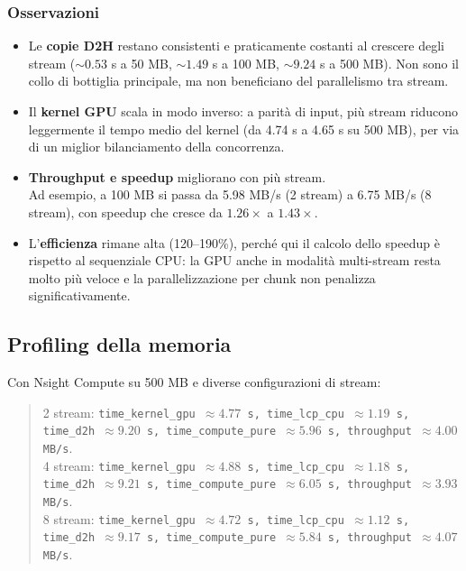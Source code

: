 			\subsubsection*{Osservazioni}
				\begin{itemize}
						\item Le \textbf{copie D2H} restano consistenti e praticamente costanti al crescere degli stream (\(\sim 0.53\) s a 50 MB, \(\sim 1.49\) s a 100 MB, \(\sim 9.24\) s a 500 MB). Non sono il collo di bottiglia principale, ma non beneficiano del parallelismo tra stream.
						\item Il \textbf{kernel GPU} scala in modo inverso: a parità di input, più stream riducono leggermente il tempo medio del kernel (da 4.74 s a 4.65 s su 500 MB), per via di un miglior bilanciamento della concorrenza.
						\item \textbf{Throughput e speedup} migliorano con più stream. \\
						Ad esempio, a 100 MB si passa da 5.98 MB/s (2 stream) a 6.75 MB/s (8 stream), con speedup che cresce da \(1.26\times\) a \(1.43\times\).
						\item L’\textbf{efficienza} rimane alta (120–190\%), perché qui il calcolo dello speedup è rispetto al sequenziale CPU: la GPU anche in modalità multi-stream resta molto più veloce e la parallelizzazione per chunk non penalizza significativamente.
				\end{itemize}
		
		\subsection{Profiling della memoria}
			Con Nsight Compute su 500 MB e diverse configurazioni di stream:
			\begin{quote}
				\small
				2 stream: \texttt{time\_kernel\_gpu \(\approx 4.77\) s, time\_lcp\_cpu \(\approx 1.19\) s, time\_d2h \(\approx 9.20\) s, time\_compute\_pure \(\approx 5.96\) s, throughput \(\approx 4.00\) MB/s}.\\
				4 stream: \texttt{time\_kernel\_gpu \(\approx 4.88\) s, time\_lcp\_cpu \(\approx 1.18\) s, time\_d2h \(\approx 9.21\) s, time\_compute\_pure \(\approx 6.05\) s, throughput \(\approx 3.93\) MB/s}.\\
				8 stream: \texttt{time\_kernel\_gpu \(\approx 4.72\) s, time\_lcp\_cpu \(\approx 1.12\) s, time\_d2h \(\approx 9.17\) s, time\_compute\_pure \(\approx 5.84\) s, throughput \(\approx 4.07\) MB/s}.
			\end{quote}
			
